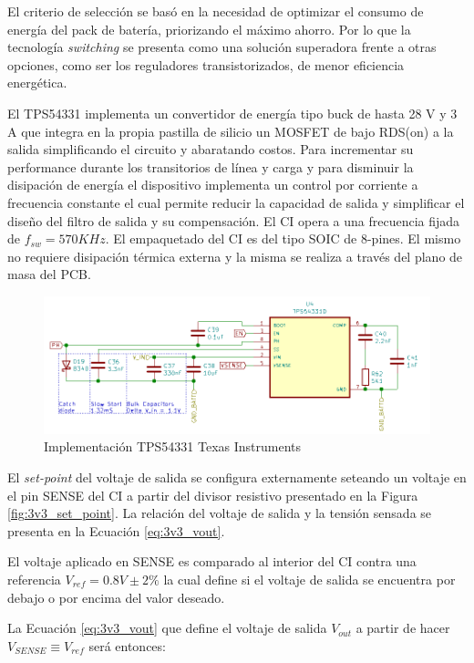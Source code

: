 \documentclass[10pt, a4paper]{report}
\begin{document}
El criterio de selección se basó en la necesidad de optimizar el consumo de
energía del pack de batería, priorizando el máximo ahorro. Por lo que la
tecnología \emph{switching} se presenta como una solución superadora frente a 
otras opciones, como ser los reguladores transistorizados, de menor eficiencia
energética.

El TPS54331 implementa un convertidor de energía tipo buck de hasta 28 V y 3 A
que integra en la propia pastilla de silicio un MOSFET de bajo RDS(on) a la
salida simplificando el circuito y abaratando costos.
Para incrementar su performance durante los transitorios de l\'inea y carga y para
disminuir la disipación de energía el dispositivo implementa un control por
corriente a frecuencia constante el cual permite reducir la capacidad de salida
y simplificar el diseño del filtro de salida y su compensación. El \acrshort{CI}
opera a una frecuencia fijada de $f_{sw}=570 KHz$.
El empaquetado del \acrshort{CI} es del tipo SOIC de 8-pines. El mismo no 
requiere disipación térmica externa y la misma se realiza a través del plano de 
masa del \acrshort{PCB}.

\begin{figure}[h!]
    \centering
    \includegraphics[width=0.8\linewidth]{hardware/3v3/3v3_IC.png}
        \caption{Implementación TPS54331 Texas Instruments}
        \label{fig:3v3_IC}
\end{figure}
\FloatBarrier

El \emph{set-point} del voltaje de salida se configura externamente seteando un 
voltaje en el pin SENSE del \acrshort{CI} a partir del divisor resistivo 
presentado en la Figura \ref{fig:3v3_set_point}. La relación del voltaje de 
salida y la tensión sensada se presenta en la Ecuación \ref{eq:3v3_vout}.

El voltaje aplicado en SENSE es comparado al interior del \acrshort{CI} contra
una referencia $V_{ref} = 0.8 V \pm2\%$ la cual define si el voltaje de
salida se encuentra por debajo o por encima del valor deseado. 

La Ecuación \ref{eq:3v3_vout} que define el voltaje de salida $V_{out}$ a partir
de hacer $ V_{SENSE} \equiv V_{ref}$ será entonces:
\end{document}
